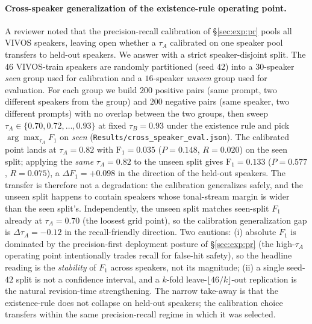 \documentclass[a4paper,fleqn]{cas-dc}
\begin{document}
\paragraph{Cross-speaker generalization of the existence-rule operating point.} A reviewer noted that the precision-recall calibration of \S\ref{sec:exp:pr} pools all VIVOS speakers, leaving open whether a $\tau_{A}$ calibrated on one speaker pool transfers to held-out speakers. We answer with a strict speaker-disjoint split. The $46$ VIVOS-train speakers are randomly partitioned (seed $42$) into a $30$-speaker \emph{seen} group used for calibration and a $16$-speaker \emph{unseen} group used for evaluation. For each group we build $200$ positive pairs (same prompt, two different speakers from the group) and $200$ negative pairs (same speaker, two different prompts) with no overlap between the two groups, then sweep $\tau_{A} \in \{0.70, 0.72, \ldots, 0.93\}$ at fixed $\tau_{B} = 0.93$ under the existence rule and pick $\arg\max_{\tau_{A}} F_{1}$ on \emph{seen} (\texttt{Results/cross\_speaker\_eval.json}). The calibrated point lands at $\tau_{A} = 0.82$ with $\mathrm{F_{1}} = 0.035$ ($P = 0.148$, $R = 0.020$) on the seen split; applying the \emph{same} $\tau_{A} = 0.82$ to the unseen split gives $\mathrm{F_{1}} = 0.133$ ($P = 0.577$, $R = 0.075$), a $\Delta F_{1} = +0.098$ in the direction of the held-out speakers. The transfer is therefore not a degradation: the calibration generalizes safely, and the unseen split happens to contain speakers whose tonal-stream margin is wider than the seen split's. Independently, the unseen split matches seen-split $F_{1}$ already at $\tau_{A} = 0.70$ (the loosest grid point), so the calibration generalization gap is $\Delta \tau_{A} = -0.12$ in the recall-friendly direction. Two cautions: (i) absolute $F_{1}$ is dominated by the precision-first deployment posture of \S\ref{sec:exp:pr} (the high-$\tau_{A}$ operating point intentionally trades recall for false-hit safety), so the headline reading is the \emph{stability} of $F_{1}$ across speakers, not its magnitude; (ii) a single seed-$42$ split is not a confidence interval, and a $k$-fold leave-$\lfloor 46/k \rfloor$-out replication is the natural revision-time strengthening. The narrow take-away is that the existence-rule does not collapse on held-out speakers; the calibration choice transfers within the same precision-recall regime in which it was selected.
\end{document}
